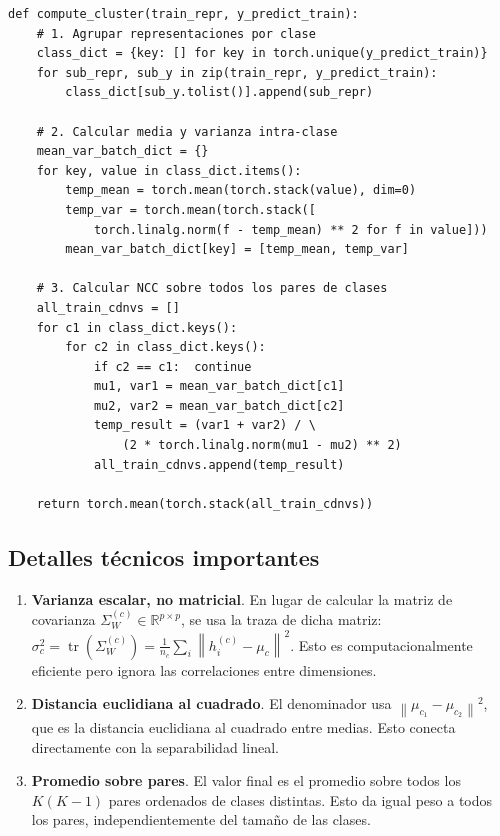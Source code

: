 \documentclass[12pt,a4paper]{report}
\newcommand{\R}{\mathbb{R}}
\newcommand{\norm}[1]{\left\lVert#1\right\rVert}
\newcommand{\tr}{\operatorname{tr}}
\begin{document}
\begin{lstlisting}
def compute_cluster(train_repr, y_predict_train):
    # 1. Agrupar representaciones por clase
    class_dict = {key: [] for key in torch.unique(y_predict_train)}
    for sub_repr, sub_y in zip(train_repr, y_predict_train):
        class_dict[sub_y.tolist()].append(sub_repr)

    # 2. Calcular media y varianza intra-clase
    mean_var_batch_dict = {}
    for key, value in class_dict.items():
        temp_mean = torch.mean(torch.stack(value), dim=0)
        temp_var = torch.mean(torch.stack([
            torch.linalg.norm(f - temp_mean) ** 2 for f in value]))
        mean_var_batch_dict[key] = [temp_mean, temp_var]

    # 3. Calcular NCC sobre todos los pares de clases
    all_train_cdnvs = []
    for c1 in class_dict.keys():
        for c2 in class_dict.keys():
            if c2 == c1:  continue
            mu1, var1 = mean_var_batch_dict[c1]
            mu2, var2 = mean_var_batch_dict[c2]
            temp_result = (var1 + var2) / \
                (2 * torch.linalg.norm(mu1 - mu2) ** 2)
            all_train_cdnvs.append(temp_result)

    return torch.mean(torch.stack(all_train_cdnvs))
\end{lstlisting}

\subsection{Detalles técnicos importantes}

\begin{enumerate}
    \item \textbf{Varianza escalar, no matricial}. En lugar de calcular la matriz de covarianza $\Sigma_W^{(c)} \in \R^{p \times p}$, se usa la traza de dicha matriz: $\sigma_c^2 = \tr(\Sigma_W^{(c)}) = \frac{1}{n_c}\sum_i \norm{h_i^{(c)} - \mu_c}^2$. Esto es computacionalmente eficiente pero ignora las correlaciones entre dimensiones.

    \item \textbf{Distancia euclidiana al cuadrado}. El denominador usa $\norm{\mu_{c_1} - \mu_{c_2}}^2$, que es la distancia euclidiana al cuadrado entre medias. Esto conecta directamente con la separabilidad lineal.

    \item \textbf{Promedio sobre pares}. El valor final es el promedio sobre todos los $K(K-1)$ pares ordenados de clases distintas. Esto da igual peso a todos los pares, independientemente del tamaño de las clases.
\end{enumerate}
\end{document}
